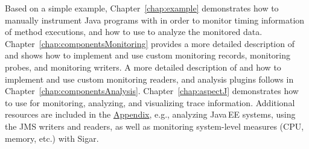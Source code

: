 Based on a simple example, Chapter~\ref{chap:example} demonstrates %
how to manually instrument Java programs with \KickerMonitoringPart{} %
in order to monitor timing information of method executions, and %
how to use \KickerAnalysisPart{} to analyze the monitored data. %
Chapter~\ref{chap:componentsMonitoring} provides a more detailed %
description of \KickerMonitoringPart{} and shows how to implement and %
use custom monitoring records, monitoring probes, and monitoring writers. %
A more detailed description of \KickerAnalysisPart{} and how to implement and use %
custom monitoring readers, and analysis plugins follows in %
Chapter~\ref{chap:componentsAnalysis}. %
Chapter~\ref{chap:aspectJ} demonstrates how to use \KickerTraceAnalysis{} %
for monitoring, analyzing, and visualizing trace information. %
Additional resources are included in the \hyperlink{hypertarget:appendix}{Appendix}, %
e.g., analyzing Java\,EE systems, using the JMS writers and readers, %
as well as monitoring system-level measures (CPU, memory, etc.) with %
Sigar. %

\vspace{1cm}



